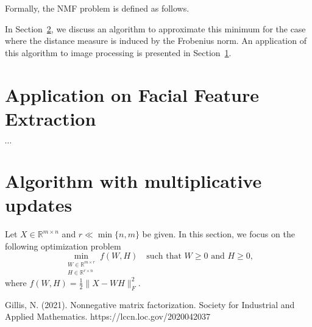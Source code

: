 \documentclass{amsart}
\newcommand{\R}{\mathbb{R}}
\begin{document}
Formally, the NMF problem is defined as follows.

\bigskip

\noindent{}

\bigskip

In Section~\ref{NMF_algorithm}, we discuss an algorithm to approximate this minimum for the case where the distance measure is induced by the Frobenius norm. An application of this algorithm to image processing is presented in Section~\ref{facial_feature_extraction}.

\section{Application on Facial Feature Extraction} \label{facial_feature_extraction}

$\cdots$

\section{Algorithm with multiplicative updates} \label{NMF_algorithm}

Let $X\in\R^{m\times n}$ and $r \ll\min\{n,m\}$ be given. In this section, we focus on the following optimization problem
\begin{equation}
    \label{optimization_problem_frobenius}
    \min_{\substack{W \in \mathbb{R}^{m \times r} \\ H \in \mathbb{R}^{r \times n}}} f(W,H) \quad \text{such that } W \geq 0 \text{ and } H \geq 0,
\end{equation}
where $f(W,H)= \frac{1}{2} \|X-WH\|_F^2$.



\begin{thebibliography}{9}
    Gillis, N. (2021). Nonnegative matrix factorization. Society for Industrial and Applied Mathematics. https://lccn.loc.gov/2020042037
\end{thebibliography}
\end{document}
